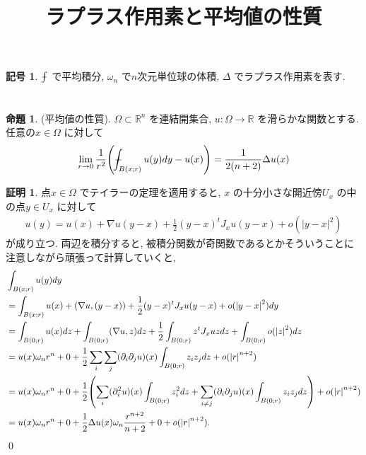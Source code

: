 \documentclass[10pt, fleqn, label-section=none]{bxjsarticle}
\title{ラプラス作用素と平均値の性質}
\date{}
\author{}
\theoremstyle{definition}
\newtheorem{prop}[dfn]{命題}
\newtheorem{notation}[dfn]{記号}
\newtheorem*{pf*}{証明}
\newcommand{\paren}[1]{\mleft( #1\mright )}
\newcommand{\abs}[1]{\left|#1\right|}
\renewcommand{\;}{\, ; \,}
\def\Xint#1{\mathchoice
{\XXint\displaystyle\textstyle{#1}}%
{\XXint\textstyle\scriptstyle{#1}}%
{\XXint\scriptstyle\scriptscriptstyle{#1}}%
{\XXint\scriptscriptstyle\scriptscriptstyle{#1}}%
\!\int}
\def\XXint#1#2#3{{\setbox0=\hbox{$#1{#2#3}{\int}$ }
\vcenter{\hbox{$#2#3$ }}\kern-.6\wd0}}
\def\dashint{\Xint-}
\begin{document}
\maketitle

\begin{notation}
$\dashint$ で平均積分, $\omega_n$ で$n$次元単位球の体積, $\Delta$ でラプラス作用素を表す. 
\end{notation}

\section{}


\begin{prop}(平均値の性質). $\Omega \subset \mathbb R^n$ を連結開集合, $u: \Omega \rightarrow \mathbb R$ を滑らかな関数とする. 任意の$x \in \Omega $ に対して
\begin{align*} \lim_{r \rightarrow 0} \frac{1}{r^2} \paren{\dashint_{B(x;r)} u(y) dy - u(x)} = \frac{1}{2(n+2)} \Delta u(x) \end{align*}
\end{prop}
\begin{pf*}点$x \in \Omega$ でテイラーの定理を適用すると, $x$ の十分小さな開近傍$U_x$ の中の点$y \in U_x$ に対して
\begin{align*} u(y) = u(x) + \nabla u (y-x) + \frac{1}{2} (y-x)^t J_x u (y-x) + o(\abs{y-x}^2)  \end{align*}
が成り立つ. 両辺を積分すると, 被積分関数が奇関数であるとかそういうことに注意しながら頑張って計算していくと, 
\begin{align*} &\int_{B(x;r)} u(y) dy \\&= \int_{B(x;r)} u(x) + (\nabla u , (y-x) )+ \frac{1}{2} (y-x)^t J_x u (y-x) + o(\abs{y-x}^2)  dy 
\\&=  \int_{B(0;r)} u(x) dz + \int_{B(0;r)}  (\nabla u , z) dz + \frac{1}{2} \int_{B(0;r)}   z^t J_x u z  dz + \int_{B(0;r)}  o(\abs{z}^2)  dz
\\& =   u(x) \omega_n r^n + 0 + \frac{1}{2} \sum_i \sum_j (\partial_i \partial_j u )(x) \int_{B(0;r)}   z_i z_j dz + o(\abs{r}^{n+2})   
\\& =  u(x) \omega_n r^n + 0 + \frac{1}{2}\paren{ \sum_{i }(\partial_i^2 u )(x)   \int_{B(0;r)}   z_i^2  dz + \sum_{i \neq j}(\partial_i \partial_j u )(x)  \int_{B(0;r)}   z_i z_j dz}  + o(\abs{r}^{n+2}) 
\\& = u(x) \omega_n r^n +0 + \frac{1}{2} \Delta u(x) \omega_n \frac{r^{n+2}}{n+2} + 0  + o(\abs{r}^{n+2}).    \end{align*}
\qed
\end{pf*}
\end{document}
